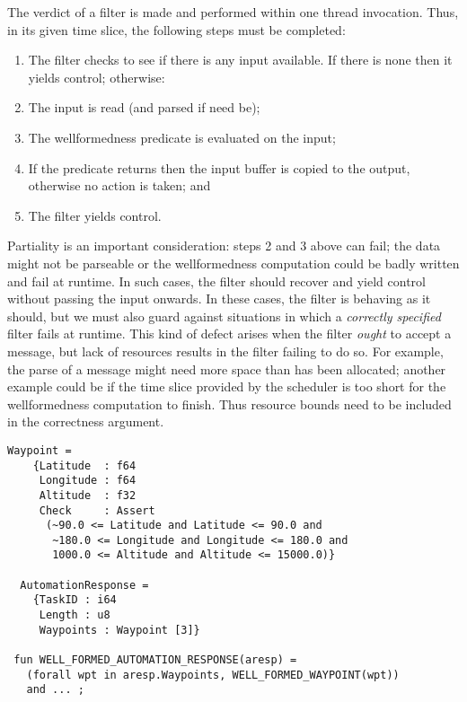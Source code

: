 The verdict of a filter is made and performed within one thread
invocation. Thus, in its given time slice, the
following steps must be completed:

\begin{enumerate}

\item The filter checks to see if there is any input available.  If there is none
then it yields control; otherwise:

\item The input is read (and parsed if need be);

\item The wellformedness predicate is evaluated on the input;

\item If the predicate returns  then the input buffer
 is copied to the output, otherwise no action is taken; and

\item The filter yields control.
\end{enumerate}

\begin{remark}[Partiality]

Partiality is an important consideration: steps 2 and 3 above can
fail; the data might not be parseable or the wellformedness
computation could be badly written and fail at runtime. In such cases,
the filter should recover and yield control without passing the input
onwards. In these cases, the filter is behaving as it should, but we
must also guard against situations in which a \emph{correctly
  specified} filter fails at runtime. This kind of defect arises when
the filter \emph{ought} to accept a message, but lack of resources
results in the filter failing to do so. For example, the parse of a
message might need more space than has been allocated; another example
could be if the time slice provided by the scheduler is too short for
the wellformedness computation to finish. Thus resource bounds need to
be included in the correctness argument.

\end{remark}


\newsavebox{\contig}
\begin{lrbox}{\contig}
\begin{lstlisting}[style=myML]
  Waypoint =
    {Latitude  : f64
     Longitude : f64
     Altitude  : f32
     Check     : Assert
      (~90.0 <= Latitude and Latitude <= 90.0 and
       ~180.0 <= Longitude and Longitude <= 180.0 and
       1000.0 <= Altitude and Altitude <= 15000.0)}

  AutomationResponse =
    {TaskID : i64
     Length : u8
     Waypoints : Waypoint [3]}

 fun WELL_FORMED_AUTOMATION_RESPONSE(aresp) =
   (forall wpt in aresp.Waypoints, WELL_FORMED_WAYPOINT(wpt))
   and ... ;
\end{lstlisting}
\end{lrbox}

